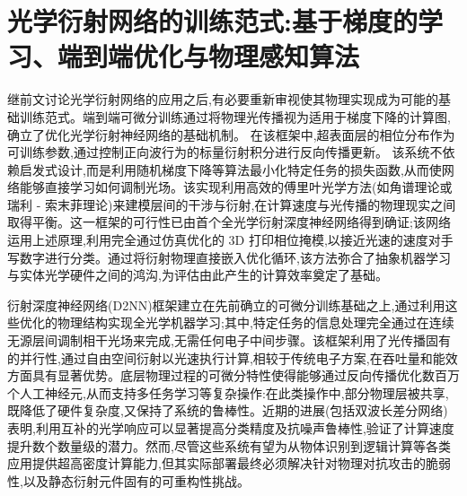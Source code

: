 \documentclass[11pt]{article}
\begin{document}
\section{光学衍射网络的训练范式:基于梯度的学习、端到端优化与物理感知算法}\label{ux5149ux5b66ux884dux5c04ux7f51ux7edcux7684ux8badux7ec3ux8303ux5f0fux57faux4e8eux68afux5ea6ux7684ux5b66ux4e60ux7aefux5230ux7aefux4f18ux5316ux4e0eux7269ux7406ux611fux77e5ux7b97ux6cd5}

继前文讨论光学衍射网络的应用之后,有必要重新审视使其物理实现成为可能的基础训练范式。端到端可微分训练通过将物理光传播视为适用于梯度下降的计算图,确立了优化光学衍射神经网络的基础机制。\citep{doi_10_1145_3508352_3549378_13c53996} \citep{doi_10_1364_oe_533298_571e0aea} 在该框架中,超表面层的相位分布作为可训练参数,通过控制正向波行为的标量衍射积分进行反向传播更新。\citep{doi_10_1117_12_3056838_7df913be} 该系统不依赖启发式设计,而是利用随机梯度下降等算法最小化特定任务的损失函数,从而使网络能够直接学习如何调制光场。该实现利用高效的傅里叶光学方法(如角谱理论或瑞利 - 索末菲理论)来建模层间的干涉与衍射,在计算速度与光传播的物理现实之间取得平衡。这一框架的可行性已由首个全光学衍射深度神经网络得到确证;该网络运用上述原理,利用完全通过仿真优化的 3D 打印相位掩模,以接近光速的速度对手写数字进行分类。通过将衍射物理直接嵌入优化循环,该方法弥合了抽象机器学习与实体光学硬件之间的鸿沟,为评估由此产生的计算效率奠定了基础。\citep{s2_f7b7631268f17b1f868015df0bd08ef57904024d_011f3a59} \citep{doi_10_3390_nano14221812_4d7d91b1} \citep{doi_10_1038_s41598_022_19973_0_e156e6e2} \citep{doi_10_3390_life13051148_9434b5b6} \citep{doi_10_1364_josab_497148_b087424b}

衍射深度神经网络(D2NN)框架建立在先前确立的可微分训练基础之上,通过利用这些优化的物理结构实现全光学机器学习;其中,特定任务的信息处理完全通过在连续无源层间调制相干光场来完成,无需任何电子中间步骤。该框架利用了光传播固有的并行性,通过自由空间衍射以光速执行计算,相较于传统电子方案,在吞吐量和能效方面具有显著优势。底层物理过程的可微分特性使得能够通过反向传播优化数百万个人工神经元,从而支持多任务学习等复杂操作:在此类操作中,部分物理层被共享,既降低了硬件复杂度,又保持了系统的鲁棒性。近期的进展(包括双波长差分网络)表明,利用互补的光学响应可以显著提高分类精度及抗噪声鲁棒性,验证了计算速度提升数个数量级的潜力。然而,尽管这些系统有望为从物体识别到逻辑计算等各类应用提供超高密度计算能力,但其实际部署最终必须解决针对物理对抗攻击的脆弱性,以及静态衍射元件固有的可重构性挑战。\citep{doi_10_1515_nanoph_2023_0760_2c3ec088} \citep{s2_88f87b34acdb11cf20ad16d6fbdd5399e8617f8f_a548a720} \citep{doi_10_1002_lpor_202500433_c50e8d3b} \citep{doi_10_1109_dac18074_2021_9586204_0c48190f}
\end{document}
